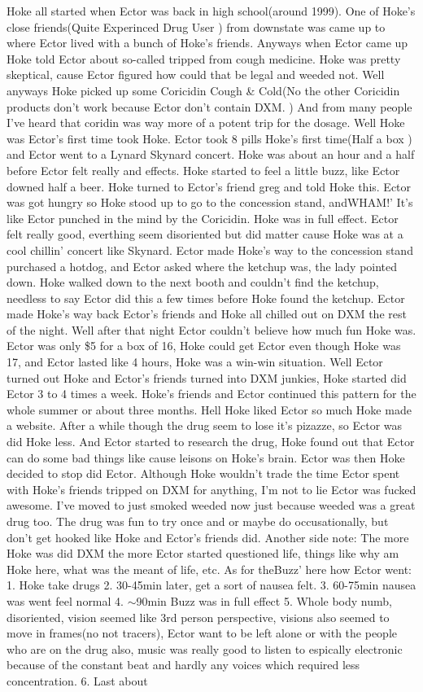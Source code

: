 \documentclass[12pt]{book}
\begin{document}
Hoke all started when Ector was back in high school(around 1999). One of Hoke's close friends(Quite Experinced Drug User ) from downstate was came up to where Ector lived with a bunch of Hoke's friends. Anyways when Ector came up Hoke told Ector about so-called tripped from cough medicine. Hoke was pretty skeptical, cause Ector figured how could that be legal and weeded not. Well anyways Hoke picked up some Coricidin Cough \& Cold(No the other Coricidin products don't work because Ector don't contain DXM. ) And from many people I've heard that coridin was way more of a potent trip for the dosage. Well Hoke was Ector's first time took Hoke. Ector took 8 pills Hoke's first time(Half a box ) and Ector went to a Lynard Skynard concert. Hoke was about an hour and a half before Ector felt really and effects. Hoke started to feel a little buzz, like Ector downed half a beer. Hoke turned to Ector's friend greg and told Hoke this. Ector was got hungry so Hoke stood up to go to the concession stand, andWHAM!' It's like Ector punched in the mind by the Coricidin. Hoke was in full effect. Ector felt really good, everthing seem disoriented but did matter cause Hoke was at a cool chillin' concert like Skynard. Ector made Hoke's way to the concession stand purchased a hotdog, and Ector asked where the ketchup was, the lady pointed down. Hoke walked down to the next booth and couldn't find the ketchup, needless to say Ector did this a few times before Hoke found the ketchup. Ector made Hoke's way back Ector's friends and Hoke all chilled out on DXM the rest of the night. Well after that night Ector couldn't believe how much fun Hoke was. Ector was only \$5 for a box of 16, Hoke could get Ector even though Hoke was 17, and Ector lasted like 4 hours, Hoke was a win-win situation. Well Ector turned out Hoke and Ector's friends turned into DXM junkies, Hoke started did Ector 3 to 4 times a week. Hoke's friends and Ector continued this pattern for the whole summer or about three months. Hell Hoke liked Ector so much Hoke made a website. After a while though the drug seem to lose it's pizazze, so Ector was did Hoke less. And Ector started to research the drug, Hoke found out that Ector can do some bad things like cause leisons on Hoke's brain. Ector was then Hoke decided to stop did Ector. Although Hoke wouldn't trade the time Ector spent with Hoke's friends tripped on DXM for anything, I'm not to lie Ector was fucked awesome. I've moved to just smoked weeded now just because weeded was a great drug too. The drug was fun to try once and or maybe do occusationally, but don't get hooked like Hoke and Ector's friends did. Another side note: The more Hoke was did DXM the more Ector started questioned life, things like why am Hoke here, what was the meant of life, etc. As for theBuzz' here how Ector went: 1. Hoke take drugs 2. 30-45min later, get a sort of nausea felt. 3. 60-75min nausea was went feel normal 4. $\sim$90min Buzz was in full effect 5. Whole body numb, disoriented, vision seemed like 3rd person perspective, visions also seemed to move in frames(no not tracers), Ector want to be left alone or with the people who are on the drug also, music was really good to listen to espically electronic because of the constant beat and hardly any voices which required less concentration. 6. Last about 
\end{document}
